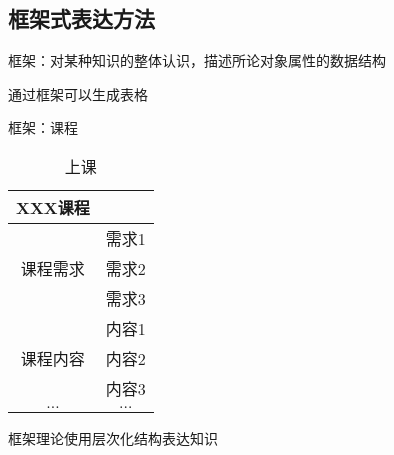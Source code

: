 
% 
\subsection{框架式表达方法}%
\label{sub:框架式表达方法}
\begin{defi}
    框架：对某种知识的整体认识，描述所论对象属性的数据结构
\end{defi}
通过框架可以生成表格
\begin{eg}
    框架：课程

    \begin{table}[htpb]
        \centering
        \caption{上课}
        \label{tab:上课}
        \begin{tabular}{|c|c|}
        \hline
        XXX课程 & \\
        \hline
        \multirow{3}{*}{课程需求} & 需求1 \\
                                  & 需求2 \\
                                  & 需求3 \\
                                  \hline
        \multirow{3}{*}{课程内容} & 内容1 \\
                                  & 内容2 \\
                                  & 内容3 \\
                                  \hline
        $\ldots$ & $\ldots$ \\
        \hline
        \end{tabular}
    \end{table}
\end{eg}
框架理论使用层次化结构表达知识
\newpage
